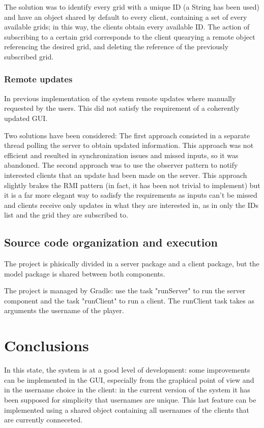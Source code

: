 \documentclass[12pt, a4paper]{report}
\begin{document}
The solution was to identify every grid with a unique ID (a String has been
 used) and have an object shared by default to every client, containing a set
 of every available grids; in this way, the clients obtain every available ID. The
 action of subscribing to a certain grid corresponds to the client quearying a
 remote object referencing the desired grid, and deleting the reference of the
 previously subscribed grid.

\subsection{Remote updates}
In previous implementation of the system remote updates where manually requested by the
 users. This did not satisfy the requirement of a coherently updated GUI.

Two solutions have been considered:
The first approach consisted in a separate thread polling the server to obtain 
 updated information. This approach was not efficient and resulted in synchronization
 issues and missed inputs, so it was abandoned. The second approach was to use the observer pattern to
 notify interested clients that an update had been made on the server. This
 approach slightly brakes the RMI pattern (in fact, it has been not trivial to
 implement) but it is a far more elegant way to sadisfy the requirements as inputs
 can't be missed and clients receive only updates in what they are interested
 in, as in only the IDs list and the grid they are subscribed to.

\section{Source code organization and execution}
The project is phisically divided in a server package and a client package, but
 the model package is shared between both components.

The project is managed by Gradle: use the task "runServer" to run the server component and the task
 "runClient" to run a client. The runClient task takes as arguments the
 username of the player.

\chapter{Conclusions}
In this state, the system is at a good level of development: some improvements
 can be implemented in the GUI, especially from the graphical point of view and in the
 username choice in the client: in the current version of the system it has
 been supposed for simplicity that usernames are unique. This last feature can
 be implemented using a shared object containing all usernames of the clients
 that are currently conneceted.



\end{document}
